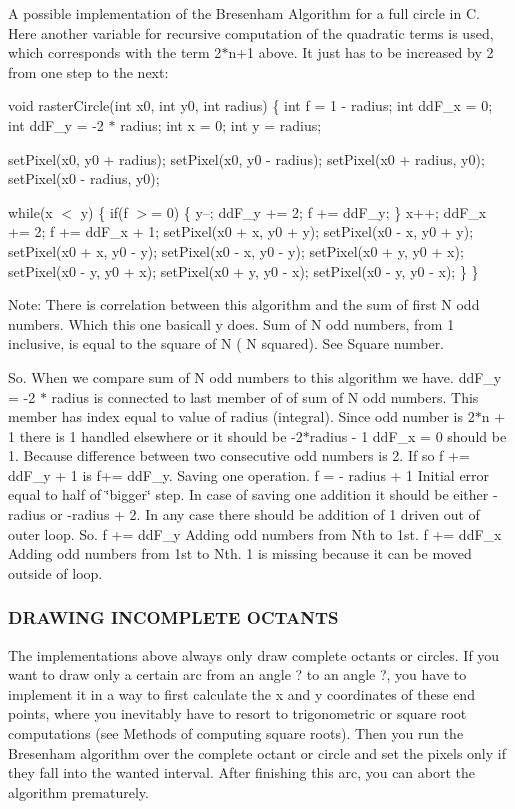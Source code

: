 A possible implementation of the Bresenham Algorithm for a full circle in C. Here another variable for recursive computation of the quadratic terms is used, which corresponds with the term 2$\ast$n+1 above. It just has to be increased by 2 from one step to the next\+:

void raster\+Circle(int x0, int y0, int radius) \{ int f = 1 -\/ radius; int dd\+F\+\_\+x = 0; int dd\+F\+\_\+y = -\/2 $\ast$ radius; int x = 0; int y = radius;

set\+Pixel(x0, y0 + radius); set\+Pixel(x0, y0 -\/ radius); set\+Pixel(x0 + radius, y0); set\+Pixel(x0 -\/ radius, y0);

while(x $<$ y) \{ if(f $>$= 0) \{ y--; dd\+F\+\_\+y += 2; f += dd\+F\+\_\+y; \} x++; dd\+F\+\_\+x += 2; f += dd\+F\+\_\+x + 1; set\+Pixel(x0 + x, y0 + y); set\+Pixel(x0 -\/ x, y0 + y); set\+Pixel(x0 + x, y0 -\/ y); set\+Pixel(x0 -\/ x, y0 -\/ y); set\+Pixel(x0 + y, y0 + x); set\+Pixel(x0 -\/ y, y0 + x); set\+Pixel(x0 + y, y0 -\/ x); set\+Pixel(x0 -\/ y, y0 -\/ x); \} \}

Note\+: There is correlation between this algorithm and the sum of first N odd numbers. Which this one basicall y does. Sum of N odd numbers, from 1 inclusive, is equal to the square of N ( N squared). See Square number.

So. When we compare sum of N odd numbers to this algorithm we have. dd\+F\+\_\+y = -\/2 $\ast$ radius is connected to last member of of sum of N odd numbers. This member has index equal to value of radius (integral). Since odd number is 2$\ast$n + 1 there is 1 handled elsewhere or it should be -\/2$\ast$radius -\/ 1 dd\+F\+\_\+x = 0 should be 1. Because difference between two consecutive odd numbers is 2. If so f += dd\+F\+\_\+y + 1 is f+= dd\+F\+\_\+y. Saving one operation. f = -\/ radius + 1 Initial error equal to half of \char`\"{}bigger\char`\"{} step. In case of saving one addition it should be either -\/radius or -\/radius + 2. In any case there should be addition of 1 driven out of outer loop. So. f += dd\+F\+\_\+y Adding odd numbers from Nth to 1st. f += dd\+F\+\_\+x Adding odd numbers from 1st to Nth. 1 is missing because it can be moved outside of loop.

\subsubsection*{D\+R\+A\+W\+I\+NG I\+N\+C\+O\+M\+P\+L\+E\+TE O\+C\+T\+A\+N\+TS}

The implementations above always only draw complete octants or circles. If you want to draw only a certain arc from an angle ? to an angle ?, you have to implement it in a way to first calculate the x and y coordinates of these end points, where you inevitably have to resort to trigonometric or square root computations (see Methods of computing square roots). Then you run the Bresenham algorithm over the complete octant or circle and set the pixels only if they fall into the wanted interval. After finishing this arc, you can abort the algorithm prematurely.

